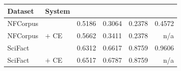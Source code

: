 \begin{tabular}{llrrrr}
    \toprule
    Dataset & System & \mrr{} & \ndcg{} & \recallH{} & \recallK{} \\
    \midrule
    NFCorpus & \bmtwofive{} & 0.5186 & 0.3064 & 0.2378 & 0.4572 \\
    NFCorpus & \bmtwofive{} $+$ CE & 0.5662 & 0.3411 & 0.2378 & n/a \\
    SciFact & \bmtwofive{} & 0.6312 & 0.6617 & 0.8759 & 0.9606 \\
    SciFact & \bmtwofive{} $+$ CE & 0.6517 & 0.6787 & 0.8759 & n/a \\
    \bottomrule
\end{tabular}
